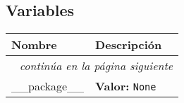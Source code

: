   \subsection{Variables}

    \vspace{-1cm}
\hspace{\varindent}\begin{longtable}{|p{\varnamewidth}|p{\vardescrwidth}|l}
\cline{1-2}
\cline{1-2} \centering \textbf{Nombre} & \centering \textbf{Descripción}& \\
\cline{1-2}
\endhead\cline{1-2}\multicolumn{3}{r}{\small\textit{continúa en la página siguiente}}\\\endfoot\cline{1-2}
\endlastfoot\raggedright \_\-\_\-p\-a\-c\-k\-a\-g\-e\-\_\-\_\- & \raggedright \textbf{Valor:} 
{\tt None}&\\
\cline{1-2}
\end{longtable}

